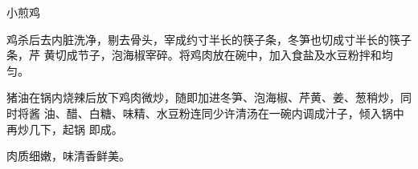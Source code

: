 %
%
%
%
%
%
%
\begin{recipe}{小煎鸡}

\ingredients


\preparation

鸡杀后去内脏洗净，剔去骨头，宰成约寸半长的筷子条，冬笋也切成寸半长的筷子条，芹
黄切成节子，泡海椒宰碎。将鸡肉放在碗中，加入食盐及水豆粉拌和均匀。

猪油在锅内烧辣后放下鸡肉微炒，随即加进冬笋、泡海椒、芹黄、姜、葱稍炒，同时将酱
油、醋、白糖、味精、水豆粉连同少许清汤在一碗内调成汁子，倾入锅中再炒几下，起锅
即成。

\features

肉质细嫩，味清香鲜美。

\end{recipe}

